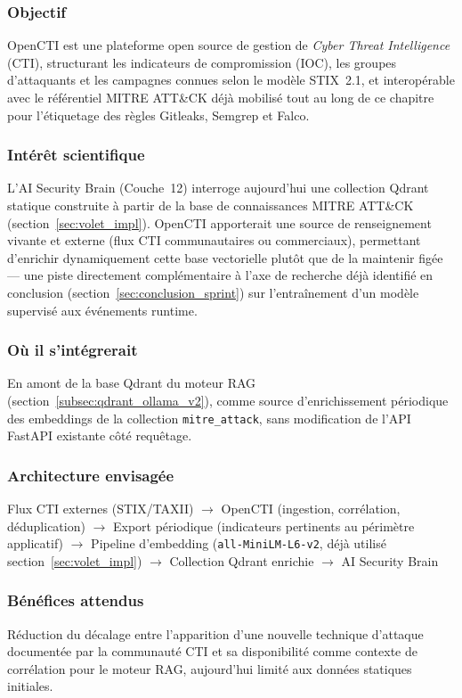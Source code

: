 \subsubsection{Objectif}
OpenCTI est une plateforme open source de gestion de \textit{Cyber Threat Intelligence} (CTI), structurant les indicateurs de compromission (IOC), les groupes d'attaquants et les campagnes connues selon le modèle STIX~2.1, et interopérable avec le référentiel MITRE ATT\&CK déjà mobilisé tout au long de ce chapitre pour l'étiquetage des règles Gitleaks, Semgrep et Falco.

\subsubsection{Intérêt scientifique}
L'AI Security Brain (Couche~12) interroge aujourd'hui une collection Qdrant statique construite à partir de la base de connaissances MITRE ATT\&CK (section~\ref{sec:volet_impl}). OpenCTI apporterait une source de renseignement vivante et externe (flux CTI communautaires ou commerciaux), permettant d'enrichir dynamiquement cette base vectorielle plutôt que de la maintenir figée — une piste directement complémentaire à l'axe de recherche déjà identifié en conclusion (section~\ref{sec:conclusion_sprint}) sur l'entraînement d'un modèle supervisé aux événements runtime.

\subsubsection{Où il s'intégrerait}
En amont de la base Qdrant du moteur RAG (section~\ref{subsec:qdrant_ollama_v2}), comme source d'enrichissement périodique des embeddings de la collection \texttt{mitre\_attack}, sans modification de l'API FastAPI existante côté requêtage.

\subsubsection{Architecture envisagée}
\begin{center}
\scriptsize
Flux CTI externes (STIX/TAXII) $\rightarrow$ OpenCTI (ingestion, corrélation, déduplication) $\rightarrow$ Export périodique (indicateurs pertinents au périmètre applicatif) $\rightarrow$ Pipeline d'embedding (\texttt{all-MiniLM-L6-v2}, déjà utilisé section~\ref{sec:volet_impl}) $\rightarrow$ Collection Qdrant enrichie $\rightarrow$ AI Security Brain
\end{center}

\subsubsection{Bénéfices attendus}
Réduction du décalage entre l'apparition d'une nouvelle technique d'attaque documentée par la communauté CTI et sa disponibilité comme contexte de corrélation pour le moteur RAG, aujourd'hui limité aux données statiques initiales.

